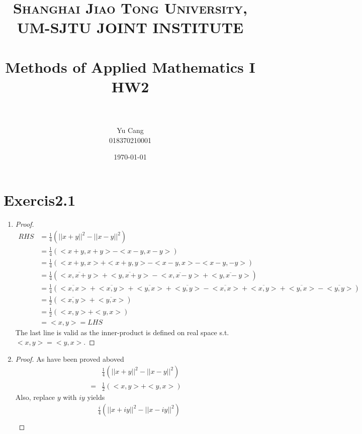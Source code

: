 \documentclass[paper=a4, fontsize=11pt]{scrartcl} %
\title{	
\normalfont \normalsize 
\textsc{Shanghai Jiao Tong University, UM-SJTU JOINT INSTITUTE} \\ [25pt] %
\horrule{0.5pt} \\[0.4cm] %
\huge Methods of Applied Mathematics I\\ HW2 \\ %
\horrule{2pt} \\[0.5cm] %
}
\author{Yu Cang \\ 018370210001} %
\date{\normalsize \today} %
\numberwithin{equation}{section} %
\numberwithin{figure}{section} %
\numberwithin{table}{section} %
\begin{document}
\maketitle %

\section{Exercis2.1}
	\begin{enumerate}
		\item 
			\begin{proof}
				\begin{equation}
					\begin{aligned}
						RHS & = \frac{1}{4} (||x+y||^2  - ||x-y||^2)\\
						    & = \frac{1}{4} (<x+y, x+y> - <x-y, x-y>)\\
						    & = \frac{1}{4} (<x+y, x> + <x+y, y> - <x-y, x> - <x-y, -y>)\\
						    & = \frac{1}{4} (\overline{<x, x+y>} + \overline{<y, x+y>} - \overline{<x, x-y>} + \overline{<y, x-y>})\\
						    & = \frac{1}{4} (\overline{<x, x>} + \overline{<x, y>} + \overline{<y, x>} + \overline{<y, y>} - \overline{<x, x>} + \overline{<x, y>} + \overline{<y, x>} - \overline{<y, y>})\\
						    & = \frac{1}{2}(\overline{<x,y>} + \overline{<y, x>})\\
						    & = \frac{1}{2}(<x, y> + <y, x>)\\
						    & = <x, y> = LHS
					\end{aligned}
				\end{equation}
				The last line is valid as the inner-product is defined on real space s.t. $<x, y>=<y, x>$.
			\end{proof}
		\item 
			\begin{proof}
				As have been proved aboved
				\begin{equation}
					\begin{aligned}
						   & \frac{1}{4} (||x+y||^2  - ||x-y||^2)\\
						=  & \frac{1}{2}(<x, y> + <y, x>)
					\end{aligned}
				\end{equation}
				Also, replace $y$ with $iy$ yields
				\begin{equation}
					\begin{aligned}
						  & \frac{i}{4} (||x+iy||^2  - ||x-iy||^2)\\

\end{aligned}
\end{equation}
\end{proof}
\end{enumerate}
\end{document}
